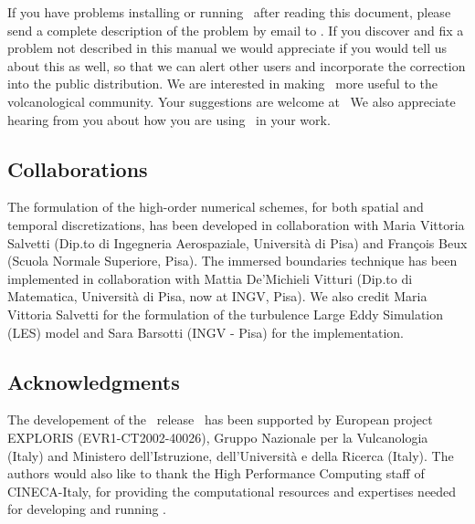 If you have problems installing or running \PDAC\ after
reading this document, please send a
complete description of the problem by email to \PDACADDRESS.
If you discover and fix a problem not described in this manual we would
appreciate if you would tell us about this as well, so that we can alert
other users and incorporate the correction into the public distribution.
\prettypar
We are interested in making \PDAC\ more useful to the volcanological
community.  Your suggestions are welcome at \PDACADDRESS\ 
We also appreciate hearing from you about how you are using \PDAC\ 
in your work.

\subsection{Collaborations}
The formulation of the high-order numerical schemes, for both spatial
and temporal discretizations, has been developed in collaboration with
Maria Vittoria Salvetti (Dip.to di Ingegneria Aerospaziale, Universit\`a 
di Pisa) and Fran\c{c}ois Beux (Scuola Normale Superiore, Pisa). The 
immersed boundaries technique has been implemented in collaboration with
Mattia De'Michieli Vitturi (Dip.to di Matematica, Universit\`a di Pisa, now 
at INGV, Pisa). 
We also credit Maria Vittoria Salvetti for the formulation of the turbulence 
Large Eddy Simulation (LES) model and Sara Barsotti (INGV - Pisa) 
for the implementation.

\subsection{Acknowledgments}

The developement of the \PDAC\ release \PDACVERSION\ has been supported 
by European project EXPLORIS (EVR1-CT2002-40026), Gruppo Nazionale per
la Vulcanologia (Italy) and Ministero dell'Istruzione, dell'Universit\`a 
e della Ricerca (Italy).
\prettypar
The authors would also like to thank the High Performance Computing
staff of CINECA-Italy, for providing the computational resources and expertises
needed for developing and running \PDAC.
\prettypar
